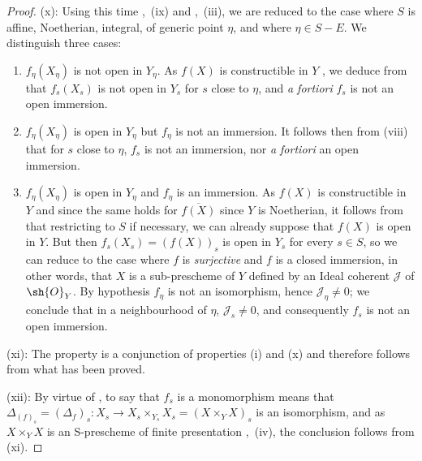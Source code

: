 \begin{proof}
(x): Using this time ,~(ix) and ,~(iii), we are reduced to the case where $S$ is affine, Noetherian, integral, of generic point $\eta$, and where $\eta\in S-E$.
We distinguish three cases:
\begin{enumerate}[label=\upshape{$\arabic{enumi}^\circ$}]
  \item $f_\eta(X_\eta)$ is not open in $Y_\eta$.
  As $f(X)$ is constructible in $Y$ , we deduce from  that $f_s(X_s)$ is not open in $Y_s$ for $s$ close to $\eta$, and \emph{a fortiori} $f_s$ is not an open immersion.

  \item $f_\eta(X_\eta)$ is open in $Y_\eta$ but $f_\eta$ is not an immersion.
  It follows then from (viii) that for $s$ close to $\eta$, $f_s$ is not an immersion, nor \emph{a fortiori} an open immersion.

  \item $f_\eta(X_\eta)$ is open in $Y_\eta$ and $f_\eta$ is an immersion.
  As $f(X)$ is constructible in $Y$  and since the same holds for $\overline{f(X)}$ since $Y$ is Noetherian, it follows from  that restricting to $S$ if necessary, we can already suppose that $f(X)$ is open in $Y$.
  But then $f_s(X_s)=(f(X))_s$ is open in $Y_s$ for every $s\in S$, so we can reduce to the case where $f$ is \emph{surjective} and $f$ is a closed immersion, in other words, that $X$ is a sub-prescheme of $Y$ defined by an Ideal coherent $\mathscr{J}$ of $\sh{O}_Y$.
  By hypothesis $f_\eta$ is not an isomorphism, hence $\mathscr{J}_\eta\neq 0$; we conclude  that in a neighbourhood of $\eta$, $\mathscr{J}_s\neq 0$, and consequently $f_s$ is not an open immersion.
\end{enumerate}

(xi): The property is a conjunction of properties (i) and (x) and therefore follows from what has been proved.

(xii): By virtue of , to say that $f_s$ is a monomorphism means that $\Delta_{(f)_s}=(\Delta_f)_s:X_s\to X_s\times_{Y_s} X_s=(X\times_Y X)_s$ is an isomorphism, and as $X\times_Y X$ is an S-prescheme of finite presentation ,~(iv), the conclusion follows from (xi).
\end{proof}

